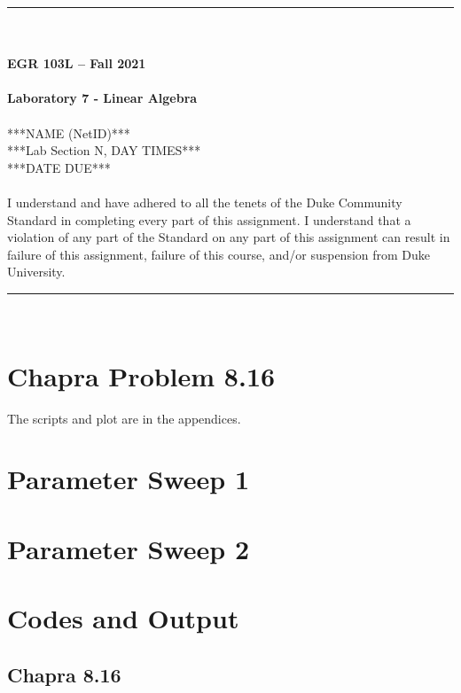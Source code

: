\documentclass{article}
\begin{document}
\begin{center}
\rule{6.5in}{0.5mm}\\~\\
\textbf{\large EGR 103L -- Fall 2021}\\~\\
\textbf{\huge Laboratory 7 - Linear Algebra}\\~\\
***NAME (NetID)***\\
***Lab Section N, DAY TIMES***\\
***DATE DUE***\\~\\
{\small I understand and have adhered to all the tenets of the Duke Community Standard in completing every part of this assignment.  I understand that a violation of any part of the Standard on any part of this assignment can result in failure of this assignment, failure of this course, and/or suspension from Duke University.} 
\rule{6.5in}{0.5mm}\\
\end{center}
\tableofcontents
\listoffigures
\pagebreak

\section{Chapra Problem 8.16}
The scripts and plot are in the appendices.

\section{Parameter Sweep 1}

\section{Parameter Sweep 2}

\pagebreak
\appendix
\section{Codes and Output}

\lstset{style=python103, language=python}

\subsection{Chapra 8.16}
\end{document}

